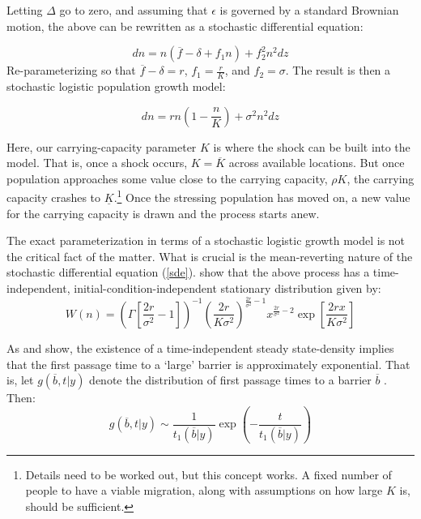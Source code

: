 \documentclass[11pt]{article}
\begin{document}
Letting $\Delta $ go to zero, and assuming that $\epsilon$ is governed by a standard Brownian motion, the above can be rewritten as a stochastic differential equation:

\begin{equation*}
dn=n(\overline{f}-\delta+f_1n)+f_2^2n^2dz
\end{equation*}
Re-parameterizing so that  $\overline{f}-\delta =r$, $f_1=\frac{r}{K}$, and $f_2=\sigma$. The result is then a stochastic logistic population growth model:

\begin{equation}
dn=rn\left(1-\frac{n}{K}\right)+\sigma^2n^2dz
\end{equation} \label{sde}

Here, our carrying-capacity parameter $K$ is where the shock can be built into the model. That is, once a shock occurs, $K=\overline{K}$ across available locations. But once population approaches some value close to the carrying capacity, $\rho K$, the carrying capacity crashes to $\underline{K}$.\footnote{Details need to be worked out, but this concept works. A fixed number of people to have a viable migration, along with assumptions on how large $K$ is, should be sufficient.} Once the stressing population has moved on, a new value for the carrying capacity is drawn and the process starts anew.

The exact parameterization in terms of a stochastic logistic growth model is not the critical fact of the matter. What is crucial is the mean-reverting nature of the stochastic differential equation (\ref{sde}). \cite{rdgn99} show that the above process has a time-independent, initial-condition-independent stationary distribution given by:
\begin{equation*}
W(n) = \left( \Gamma\left[\frac{2r}{\sigma^2}-1\right]\right)^{-1}\left(\frac{2r}{K\sigma^2}\right)^{\frac{2r}{\sigma^2}-1}x^{\frac{2r}{\sigma^2}-2}\exp\left[\frac{2rx}{K\sigma^2}\right]
\end{equation*}

As \cite{rdgn99} and \cite{nrs85} show, the existence of a time-independent steady state-density implies that the first passage time to a `large' barrier is approximately exponential. That is, let $g(\overline{b},t|y)$ denote the distribution of first passage times to a barrier $\overline{b}$ . Then:
\begin{equation*}
g(\overline{b},t|y) \sim \frac{1}{t_1(\overline{b}|y)}\exp\left(-\frac{t}{t_1(\overline{b}|y)}\right) 
\end{equation*}
\end{document}
